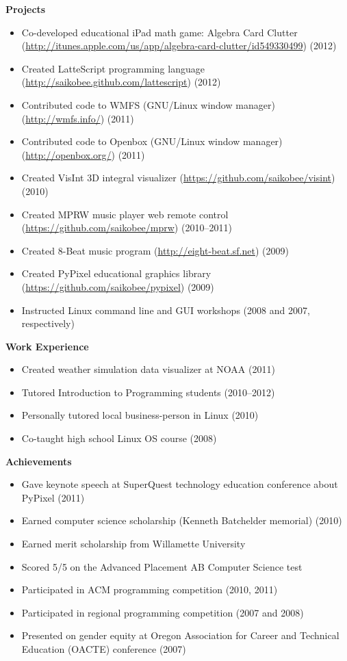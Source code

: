 \documentclass[10pt]{article}
\begin{document}
\medskip
\noindent \textbf{Projects} \hrulefill
\begin{itemize}
\item Co-developed educational iPad math game: Algebra Card Clutter \\
(\url{http://itunes.apple.com/us/app/algebra-card-clutter/id549330499})
(2012)
\item Created LatteScript programming language
    (\url{http://saikobee.github.com/lattescript}) (2012)
\item Contributed code to WMFS (GNU/Linux window manager)
    (\url{http://wmfs.info/}) (2011)
\item Contributed code to Openbox (GNU/Linux window manager)
    (\url{http://openbox.org/}) (2011)
\item Created VisInt 3D integral visualizer
    (\url{https://github.com/saikobee/visint}) (2010)
\item Created MPRW music player web remote control
    (\url{https://github.com/saikobee/mprw}) (2010\---2011)
\item Created 8-Beat music program
    (\url{http://eight-beat.sf.net}) (2009)
\item Created PyPixel educational graphics library
    (\url{https://github.com/saikobee/pypixel}) (2009)
\item Instructed Linux command line and GUI workshops (2008 and 2007, respectively)
\end{itemize}

\medskip
\noindent \textbf{Work Experience} \hrulefill
\begin{itemize}
\item Created weather simulation data visualizer at NOAA (2011)
\item Tutored Introduction to Programming students (2010\---2012)
\item Personally tutored local business-person in Linux (2010)
\item Co-taught high school Linux OS course (2008)
\end{itemize}

\medskip
\noindent \textbf{Achievements} \hrulefill
\begin{itemize}
\item Gave keynote speech at SuperQuest technology education conference about
PyPixel (2011)
\item Earned computer science scholarship (Kenneth Batchelder memorial) (2010)
\item Earned merit scholarship from Willamette University
\item Scored 5/5 on the Advanced Placement AB Computer Science test
\item Participated in ACM programming competition (2010, 2011)
\item Participated in regional programming competition (2007 and 2008)
\item Presented on gender equity at Oregon Association for Career and
Technical Education (OACTE) conference (2007)
\end{itemize}
\end{document}
